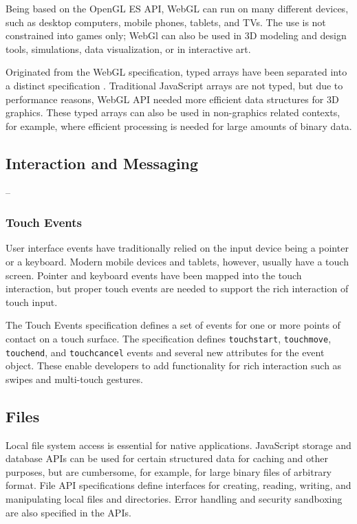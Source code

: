 Being based on the OpenGL ES API, WebGL can run on many different
devices, such as desktop computers, mobile phones, tablets, and
TVs. The use is not constrained into games only; WebGl can also be
used in 3D modeling and design tools, simulations, data visualization,
or in interactive art.

Originated from the WebGL specification, typed arrays have been
separated into a distinct specification
\cite{TypedArrays}. Traditional JavaScript arrays are not typed, but
due to performance reasons, WebGL API needed more efficient data
structures for 3D graphics. These typed arrays can also be used in
non-graphics related contexts, for example, where efficient processing
is needed for large amounts of binary data.

\subsection{Interaction and Messaging}

--

\subsubsection{Touch Events}

User interface events have traditionally relied on the input device
being a pointer or a keyboard. Modern mobile devices and tablets,
however, usually have a touch screen. Pointer and keyboard events have
been mapped into the touch interaction, but proper touch events are
needed to support the rich interaction of touch input.

The Touch Events specification \cite{touchevents} defines a set of
events for one or more points of contact on a touch surface. The
specification defines \texttt{touchstart}, \texttt{touchmove},
\texttt{touchend}, and \texttt{touchcancel} events and several new
attributes for the event object. These enable developers to add
functionality for rich interaction such as swipes and multi-touch
gestures.

\subsection{Files}
\label{section:fileapi}

Local file system access is essential for native
applications. JavaScript storage and database APIs can be used for
certain structured data for caching and other purposes, but are
cumbersome, for example, for large binary files of arbitrary
format. File API specifications \cite{FileAPI, FileAPIWriter,
  FileAPIDir} define interfaces for creating, reading, writing, and
manipulating local files and directories. Error handling and security
sandboxing are also specified in the APIs.


